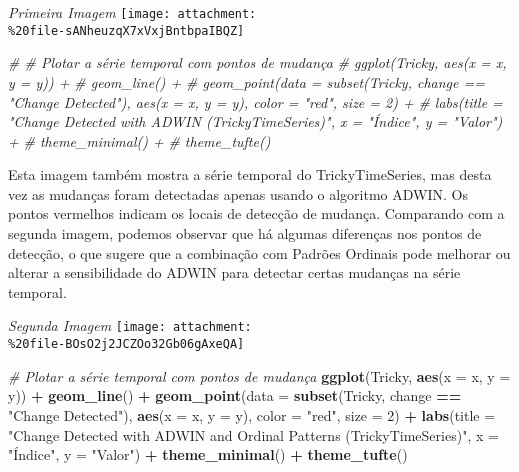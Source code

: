 \documentclass[
]{article}
\newenvironment{Shaded}{\begin{snugshade}}{\end{snugshade}}
\newcommand{\AttributeTok}[1]{\textcolor[rgb]{0.13,0.29,0.53}{#1}}
\newcommand{\CommentTok}[1]{\textcolor[rgb]{0.56,0.35,0.01}{\textit{#1}}}
\newcommand{\DecValTok}[1]{\textcolor[rgb]{0.00,0.00,0.81}{#1}}
\newcommand{\FunctionTok}[1]{\textcolor[rgb]{0.13,0.29,0.53}{\textbf{#1}}}
\newcommand{\NormalTok}[1]{#1}
\newcommand{\SpecialCharTok}[1]{\textcolor[rgb]{0.81,0.36,0.00}{\textbf{#1}}}
\newcommand{\StringTok}[1]{\textcolor[rgb]{0.31,0.60,0.02}{#1}}
\begin{document}
\emph{Primeira Imagem}
\texttt{[image: attachment:\\\%20file-sANheuzqX7xVxjBntbpaIBQZ]}

\begin{Shaded}
\begin{Highlighting}[]
\CommentTok{\# \# Plotar a série temporal com pontos de mudança}
\CommentTok{\# ggplot(Tricky, aes(x = x, y = y)) +}
\CommentTok{\#   geom\_line() +}
\CommentTok{\#   geom\_point(data = subset(Tricky, change == "Change Detected"), aes(x = x, y = y), color = "red", size = 2) +}
\CommentTok{\#   labs(title = "Change Detected with ADWIN (TrickyTimeSeries)", x = "Índice", y = "Valor") +}
\CommentTok{\#   theme\_minimal() +}
\CommentTok{\#   theme\_tufte()}
\end{Highlighting}
\end{Shaded}

Esta imagem também mostra a série temporal do TrickyTimeSeries, mas
desta vez as mudanças foram detectadas apenas usando o algoritmo ADWIN.
Os pontos vermelhos indicam os locais de detecção de mudança. Comparando
com a segunda imagem, podemos observar que há algumas diferenças nos
pontos de detecção, o que sugere que a combinação com Padrões Ordinais
pode melhorar ou alterar a sensibilidade do ADWIN para detectar certas
mudanças na série temporal.

\emph{Segunda Imagem}
\texttt{[image: attachment:\\\%20file-BOsO2j2JCZOo32Gb06gAxeQA]}

\begin{Shaded}
\begin{Highlighting}[]
\CommentTok{\# Plotar a série temporal com pontos de mudança}
\FunctionTok{ggplot}\NormalTok{(Tricky, }\FunctionTok{aes}\NormalTok{(}\AttributeTok{x =}\NormalTok{ x, }\AttributeTok{y =}\NormalTok{ y)) }\SpecialCharTok{+}
  \FunctionTok{geom\_line}\NormalTok{() }\SpecialCharTok{+}
  \FunctionTok{geom\_point}\NormalTok{(}\AttributeTok{data =} \FunctionTok{subset}\NormalTok{(Tricky, change }\SpecialCharTok{==} \StringTok{"Change Detected"}\NormalTok{), }\FunctionTok{aes}\NormalTok{(}\AttributeTok{x =}\NormalTok{ x, }\AttributeTok{y =}\NormalTok{ y), }\AttributeTok{color =} \StringTok{"red"}\NormalTok{, }\AttributeTok{size =} \DecValTok{2}\NormalTok{) }\SpecialCharTok{+}
  \FunctionTok{labs}\NormalTok{(}\AttributeTok{title =} \StringTok{"Change Detected with ADWIN and Ordinal Patterns (TrickyTimeSeries)"}\NormalTok{, }\AttributeTok{x =} \StringTok{"Índice"}\NormalTok{, }\AttributeTok{y =} \StringTok{"Valor"}\NormalTok{) }\SpecialCharTok{+}
  \FunctionTok{theme\_minimal}\NormalTok{() }\SpecialCharTok{+}
  \FunctionTok{theme\_tufte}\NormalTok{()}
\end{Highlighting}
\end{Shaded}
\end{document}
